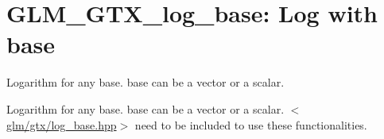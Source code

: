 \hypertarget{group__gtx__log__base}{\section{\-G\-L\-M\-\_\-\-G\-T\-X\-\_\-log\-\_\-base\-: \-Log with base}
\label{group__gtx__log__base}
}


\-Logarithm for any base. base can be a vector or a scalar.  


\-Logarithm for any base. base can be a vector or a scalar. $<$\hyperlink{log__base_8hpp}{glm/gtx/log\-\_\-base.\-hpp}$>$ need to be included to use these functionalities. 
